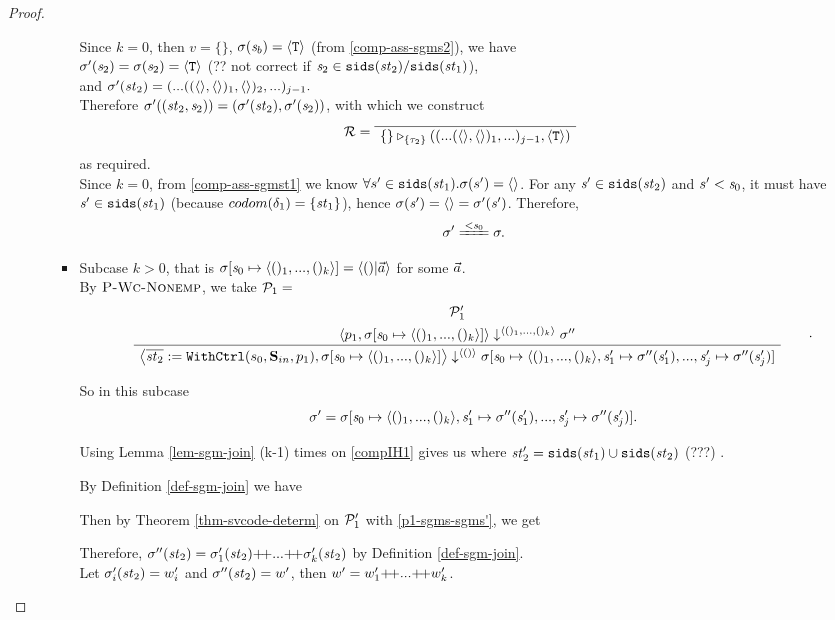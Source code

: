 \begin{proof}
\begin{itemize}
\begin{enumerate}[(i)]
\begin{itemize}
	Since $k=0$, then $v = \{ \}$, $\sigma(\mathit{s}_b) = \langle \mathtt{T} \rangle$ (from \eqref{comp-ass-sgms2}), we have \\
	{\color{red} $\sigma'(\mathit{s}_2) = \sigma(\mathit{s}_2) = \langle \mathtt{T} \rangle$ (?? not correct if $\mathit{s}_2 \in \mathtt{sids}(\mathit{st}_2)/\mathtt{sids}(\mathit{st}_1)$)}, \\
	and $\sigma'(\mathit{st}_2) = (...((\langle \rangle,\langle \rangle)_1,\langle \rangle)_2,...)_{j-1}.$ \\
	
	Therefore $\sigma'((\mathit{st}_2,\mathit{s}_2)) = (\sigma'(\mathit{st}_2), \sigma'(\mathit{s}_2))$, with which we construct 
	$$\MR = 
	\PT{\Axiom{\ValRep{\{\}}{\tseq{\tau_2}}{((...(\emptyv,\emptyv)_1,...)_{j-1},\oT)}}}$$ 
	as required.\\
    
    Since $k=0$, from \eqref{comp-ass-sgmst1} we know $\forall s' \in \mathtt{sids}(\mathit{st}_1). \sigma(s') = \langle \rangle$. 
    For any $\mathit{s}' \in \mathtt{sids}(\mathit{st}_2)$ and $s' < \mathit{s}_0$, it must have $\mathit{s}' \in \mathtt{sids}(\mathit{st}_1)$ 
    (because $codom(\delta_1) = \{\mathit{st}_1\}$), hence $\sigma(\mathit{s}') = \langle \rangle = \sigma'(\mathit{s}')$. 
    Therefore, $$\sgm' \ConEq{\s_0} \sgm.$$
    

\def\sgmp-nonempty{\sgm[\s_0 \|-> \kunit, \s_1' \|-> \sgm''(\s'_1),...,
	\s'_j \|-> \sgm''(\s'_j)]}  

	\item \label{subcase-2} 
	Subcase $k > 0$, that is $\sgmsz = \< ()|\a \'>$ for some $\vec a$. \\
	By $\textsc{P-Wc-Nonemp}$, we take $\mathcal{P}_1 = $
	$$\PT{
		\UCN{\MP_1'}{\seval{p_1}{\sgmsz}{\kunit}{\sgm''}}
		\UC{\seval{\withctrl {s_0} {p_1} {\Sin}{\overline{\st_2}} } 
				  {\sgmsz} 
				  {\vunit} 
				  {\sgmp-nonempty}}
	}.$$
	
	So in this subcase $$\sgm' = \sgmp-nonempty.$$
	
	Using Lemma \ref{lem-sgm-join} (k-1) times on \eqref{compIH1} gives us
	where $\mathit{st}_2' = \mathtt{sids}(\mathit{st}_1) \cup \mathtt{sids}(\mathit{st}_2)$ (???) . 
	
	By Definition \ref{def-sgm-join} we have
	
	Then by Theorem \ref{thm-svcode-determ} on $\mathcal{P}_1'$ with \eqref{p1-sgms-sgms'}, we get
	
	Therefore, $\sgm''(\st_2) = \sgm'_1(\st_2) {\++} ... {\++} \sgm'_k(\st_2)$ by Definition \ref{def-sgm-join}.\\
	Let $\sigma'_i(\mathit{st}_2) = w'_i$ and  $\sigma''(\mathit{st}_2) = w'$, then
	$w' = w'_1 {\++} ... {\++} w'_k$. \\
	

\end{itemize}
\end{enumerate}
\end{itemize}
\end{proof}
